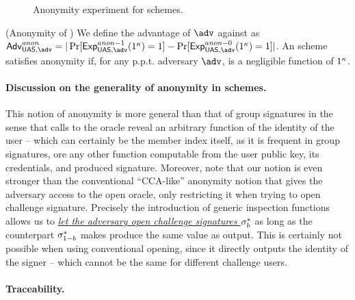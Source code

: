 \begin{figure}[htp!]
  \caption{Anonymity experiment for \UAS schemes.}
  \label{fig:exp-uas-anonb}
\end{figure}

\begin{definition}{(Anonymity of \UAS)}
  We define the advantage \AdvAnon of $\adv$ against \ExpAnonb as
  $\AdvAnon=|\Pr\lbrack\ExpAnono(1^\secpar)=1\rbrack-
  \Pr\lbrack\ExpAnonz(1^\secpar)=1\rbrack|$.
  An \UAS scheme satisfies anonymity if, for any p.p.t. adversary $\adv$,
  \AdvAnon is a negligible function of $1^\kappa$.
\end{definition}

\paragraph{Discussion on the generality of anonymity in \UAS schemes.} %
This notion of anonymity is more general than that of group signatures in the
sense that calls to the \INSPECT oracle reveal an arbitrary function of the
identity of the user -- which can certainly be the member index itself, as it
is frequent in group signatures, ore any other function computable from the
user public key, its credentials, and produced signature. Moreover, note that
our notion is even stronger than the conventional ``CCA-like'' anonymity notion
that gives the adversary access to the open oracle, only restricting it when
trying to open challenge signature. Precisely the introduction of generic
inspection functions allows us to \underline{\emph{let the adversary open
    challenge signatures $\mathsf{\sigma}^*_b$}} as long as the counterpart $\mathsf{\sigma}^*_{1-b}$
makes \Inspect produce the same \y value as output. This is certainly not
possible when using conventional opening, since it directly outputs the identity
of the signer -- which cannot be the same for different challenge users.

\paragraph{Traceability.} %

